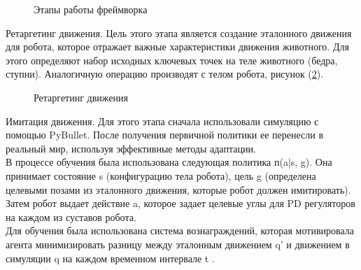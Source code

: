 \documentclass[12 pt, a4paper]{article}
\theoremstyle{definition}
\theoremstyle{plain}
\theoremstyle{remark}
\begin{document}
\begin{figure}[h]
	           \caption{Этапы работы фреймворка}
		
\label{ris:7}
\end{figure}

Ретаргетинг движения. Цель этого этапа является создание эталонного движения для робота, которое отражает важные характеристики движения животного. Для этого определяют набор исходных ключевых точек на теле животного (бедра, ступни). Аналогичную операцию производят с телом робота, рисунок (\ref{ris:8}). \\
\begin{figure}[h]
	           \caption{Ретаргетинг движения}
		
\label{ris:8}
\end{figure}
Имитация движения. Для этого этапа сначала использовали симуляцию с  помощью PyBullet. После получения первичной политики ее перенесли в реальный мир, используя эффективные методы адаптации. \\
В процессе обучения была использована следующая политика п(a|s, g). Она принимает состояние s (конфигурацию тела робота), цель g (определена целевыми позами из эталонного движения, которые робот должен имитировать). Затем робот выдает действие a, которое задает целевые углы для PD регуляторов на каждом из суставов робота. \\
Для обучения была использована система вознаграждений, которая мотивировала агента минимизировать разницу между эталонным движением q' и движением в симуляции q на каждом временном интервале t .\\
\end{document}

